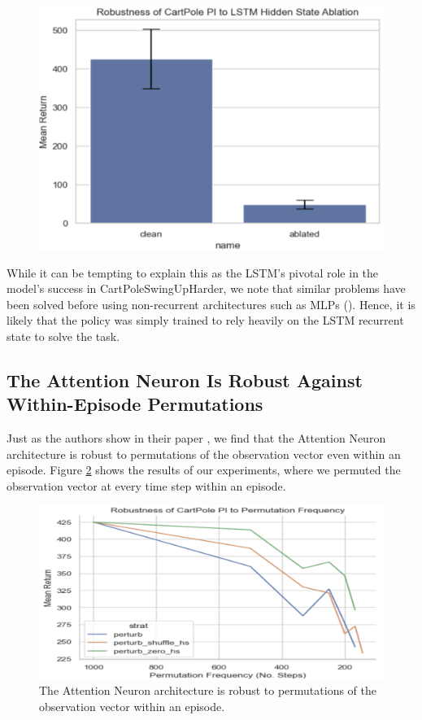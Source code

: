 \documentclass{article}
\begin{document}
\begin{figure}[h]
    \centering
    \includegraphics[width=\textwidth]{images/perf_collapse.png}
    \label{fig:attention_neuron_zeroed_lstm}
\end{figure}

While it can be tempting to explain this as the LSTM's pivotal role in the model's success
in CartPoleSwingUpHarder, we note that similar problems have been solved before
using non-recurrent architectures such as MLPs (\cite{ppo-cpsw-2022}).
Hence, it is likely that the policy was simply trained to rely heavily
on the LSTM recurrent state to solve the task.

\subsection{The Attention Neuron Is Robust Against Within-Episode Permutations}

Just as the authors show in their paper \cite{Tang-and-Ha-2021},
we find that the Attention Neuron architecture is robust to permutations of the observation vector
even within an episode.
Figure \ref{fig:attention_neuron_permutation_invariance_within_episode} shows the results of our experiments,
where we permuted the observation vector at every time step within an episode.

\begin{figure}[h]
    \centering
    \includegraphics[width=\textwidth]{images/permutation_frequency.png}
    \caption{The Attention Neuron architecture is robust to permutations of the observation vector within an episode.
    }
    \label{fig:attention_neuron_permutation_invariance_within_episode}
\end{figure}
\end{document}
